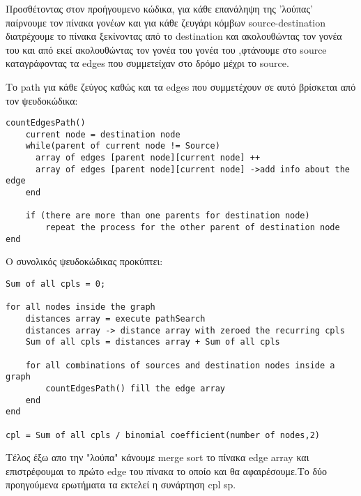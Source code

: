 \documentclass{article}
\begin{document}
Προσθέτοντας στον προήγουμενο κώδικα, για κάθε επανάληψη της 'λούπας' παίρνουμε τον πίνακα γονέων και για κάθε ζευγάρι κόμβων source-destination διατρέχουμε το πίνακα ξεκίνοντας από το destination και ακολουθώντας τον γονέα του και από εκεί ακολουθώντας τον γονέα του γονέα του ,φτάνουμε στο source καταγράφοντας τα edges που συμμετείχαν στο δρόμο μέχρι το source.\pagebreak

Το path για κάθε ζεύγος καθώς και τα edges που συμμετέχουν σε αυτό βρίσκεται από τον ψευδοκώδικα:

\begin{lstlisting}
countEdgesPath()
	current node = destination node
	while(parent of current node != Source)
	  array of edges [parent node][current node] ++
	  array of edges [parent node][current node] ->add info about the edge
	end
	
	if (there are more than one parents for destination node)
		repeat the process for the other parent of destination node
end
\end{lstlisting}

Ο συνολικός ψευδοκώδικας προκύπτει:
\bigbreak
{}

\begin{lstlisting}
Sum of all cpls = 0;

for all nodes inside the graph
	distances array = execute pathSearch
	distances array -> distance array with zeroed the recurring cpls
	Sum of all cpls = distances array + Sum of all cpls
	
	for all combinations of sources and destination nodes inside a graph
		countEdgesPath() fill the edge array
	end 
end

cpl = Sum of all cpls / binomial coefficient(number of nodes,2)
\end{lstlisting}\bigbreak
{}

Τέλος έξω απο την "λούπα" κάνουμε merge sort το πίνακα edge array και επιστρέφουμαι το πρώτο edge του πίνακα το οποίο και θα αφαιρέσουμε.Το δύο προηγούμενα ερωτήματα τα εκτελεί η συνάρτηση cpl sp.\pagebreak
\end{document}
